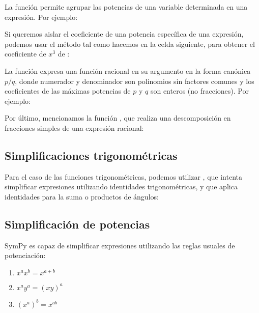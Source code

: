 
La función  permite agrupar las potencias de una variable determinada en una expresión. Por ejemplo:


Si queremos aislar el coeficiente de una potencia específica de una expresión, podemos usar el método  tal como hacemos en la celda siguiente, para obtener el coeficiente de $x^3$ de :


La función  expresa una función racional en su argumento en la forma canónica $p/q$, donde numerador y denominador son polinomios sin factores comunes y los coeficientes de las máximas potencias de $p$ y $q$ son enteros (no fracciones). Por ejemplo:


Por último, mencionamos la función , que realiza una descomposición en fracciones simples de una expresión racional:


\subsection{Simplificaciones trigonométricas}
Para el caso de las funciones trigonométricas, podemos utilizar , que intenta simplificar expresiones utilizando identidades trigonométricas, y  que aplica identidades para la suma o productos de ángulos:


\subsection{Simplificación de potencias}
SymPy es capaz de simplificar expresiones utilizando las reglas usuales de potenciación:
\begin{enumerate}
    \item $x^a x^b = x^{a + b}$
    \item $x^a y^a = (xy)^a$
    \item $(x^a)^b = x^{ab}$
\end{enumerate}

